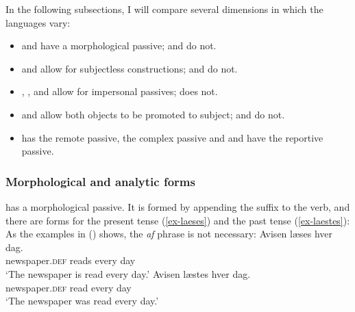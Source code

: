 In the following subsections, I will compare several dimensions in which the  languages
vary:
\begin{itemize}
\item {} and  have a morphological passive;  and  do not.

\item {} and  allow for subjectless constructions;  and  do not.

\item {}, , and  allow for impersonal passives;  does not.

\item {} and  allow both objects to be promoted to subject;  and  do not.

\item {} has the remote passive,  the complex passive and  and 
  have the reportive passive.
\end{itemize}



\subsubsection{Morphological and analytic forms}

 has a morphological passive. It is formed by appending the suffix  to the verb, and there
are forms for the present tense (\ref{ex-laeses}) and the past tense (\ref{ex-laestes}):
\eal
{}
\zl
As the examples in () shows, the \emph{af} phrase is not necessary:
\eal
\ex 
\gll Avisen        læses           hver   dag.\\
     newspaper.\textsc{def} reads  every day\\\danish
\glt `The newspaper is read every day.'
\ex 
\gll Avisen        læstes           hver   dag.\\
     newspaper.\textsc{def} read  every day\\\danish
\glt `The newspaper was read every day.'
\zl

